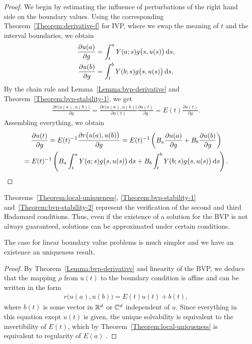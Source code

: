 \begin{proof}
  We begin by estimating the influence of perturbations of the right
  hand side on the boundary values. Using the corresponding
  Theorem~\ref{Theorem:derivative-f} for IVP, where we swap the
  meaning of $t$ and the interval boundaries, we obtain
  \begin{align*}
    \frac{\partial u(a)}{\partial g}
    &= \int_t^a \fundamental(a;s) g\bigl(s,u(s)\bigr) \ds,
    \\
    \frac{\partial u(b)}{\partial g}
    &= \int_t^b \fundamental(b;s) g\bigl(s,u(s)\bigr) \ds,
  \end{align*}
  By the chain rule and Lemma~\ref{Lemma:bvp-derivative}
  and Theorem~\ref{Theorem:bvp-stability-1}, we get
  \begin{gather*}
    \frac{\partial r\bigl(u(a), u(b)\bigr)}{\partial g}
    = \frac{\partial r\bigl(u(a), u(b)\bigr)}{\partial u(t)}
    \frac{\partial u(t)}{\partial g}
    = E(t)\frac{\partial u(t)}{\partial g}.
  \end{gather*}
Assembling everything, we obtain
\begin{multline*}
  \frac{\partial u(t)}{\partial g}
  = E(t)^{-1} \frac{\partial r\bigl(u(a), u(b)\bigr)}{\partial g}
  = E(t)^{-1} \left(
    \rwaa \frac{\partial u(a)}{\partial g}
    + \rwab \frac{\partial u(b)}{\partial g}\right)
  \\
  = E(t)^{-1} \left(
    \rwaa \int_t^a \fundamental(a;s) g\bigl(s,u(s)\bigr) \ds
    + \rwab \int_t^b \fundamental(b;s) g\bigl(s,u(s)\bigr) \ds
    \right).
  \end{multline*}
\end{proof}

\begin{remark}
  Theorems~\ref{Theorem:local-uniqueness}, \ref{Theorem:bvp-stability-1}
  and~\ref{Theorem:bvp-stability-2} represent the verification of the
  second and third Hadamard conditions.
  Thus, even if the existence of a solution for the BVP is not always
  guaranteed, solutions can be approximated under certain conditions.
  
  The case for linear boundary value problems is much simpler and we
  have an existence an uniqueness result.
\end{remark}



\begin{proof}
  By Theorem~\ref{Lemma:bvp-derivative} and linearity of the BVP,
  we deduce that the mapping $\rho$ from $u(t)$ to the boundary
  condition is affine and can be written in the form
  \begin{gather*}
    r\bigl(u(a),u(b)\bigr) = E(t) u(t) + b(t),
  \end{gather*}
  where $b(t)$ is some vector in $\mathbb R^d$ or $\mathbb C^d$ independent of
  $u$. Since everything in this equation exept $u(t)$ is given, the
  unique solvability is equivalent to the invertibility of $E(t)$,
  which by Theorem~\ref{Theorem:local-uniqueness} is equivalent to
  regularity of $E(a)$ .
\end{proof}


